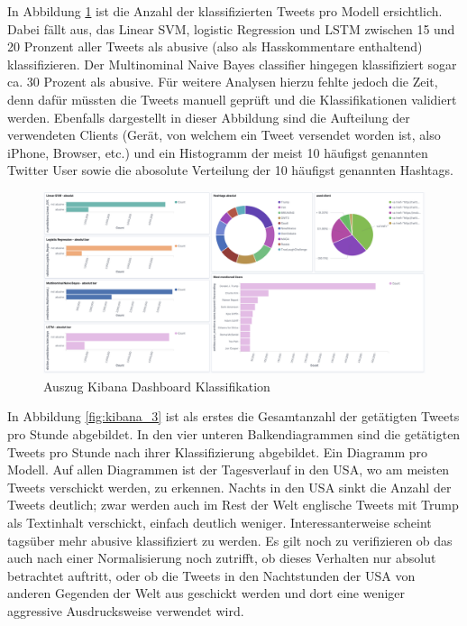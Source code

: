 In Abbildung \ref{fig:kibana_2} ist die Anzahl der klassifizierten Tweets pro Modell ersichtlich. Dabei f{\"a}llt aus, das Linear SVM, logistic Regression und LSTM zwischen 15 und 20 Pronzent aller Tweets als abusive (also als Hasskommentare enthaltend) klassifizieren. Der Multinominal Naive Bayes classifier hingegen klassifiziert sogar ca. 30 Prozent als abusive. F{\"u}r weitere Analysen hierzu fehlte jedoch die Zeit, denn daf{\"u}r m{\"u}ssten die Tweets manuell gepr{\"u}ft und die Klassifikationen validiert werden. Ebenfalls dargestellt in dieser Abbildung sind die Aufteilung der verwendeten Clients (Ger{\"a}t, von welchem ein Tweet versendet worden ist, also iPhone, Browser, etc.) und ein Histogramm der meist 10 h{\"a}ufigst genannten Twitter User sowie die abosolute Verteilung der 10 h{\"a}ufigst genannten Hashtags.

\begin{figure}[H]
	\centering
		\includegraphics[scale=0.3]{images/kibana_dash_3.png}
	\caption{Auszug Kibana Dashboard Klassifikation}
	\label{fig:kibana_2}
\end{figure}

In Abbildung \ref{fig:kibana_3} ist als erstes die Gesamtanzahl der get{\"a}tigten Tweets pro Stunde abgebildet. In den vier unteren Balkendiagrammen sind die get{\"a}tigten Tweets pro Stunde nach ihrer Klassifizierung abgebildet. Ein Diagramm pro Modell. Auf allen Diagrammen ist der Tagesverlauf in den USA, wo am meisten Tweets verschickt werden, zu erkennen. Nachts in den USA sinkt die Anzahl der Tweets deutlich; zwar werden auch im Rest der Welt englische Tweets mit Trump als Textinhalt verschickt, einfach deutlich weniger. Interessanterweise scheint tags{\"u}ber mehr abusive klassifiziert zu werden. Es gilt noch zu verifizieren ob das auch nach einer Normalisierung noch zutrifft, ob dieses Verhalten nur absolut betrachtet auftritt, oder ob die Tweets in den Nachtstunden der USA von anderen Gegenden der Welt aus geschickt werden und dort eine weniger aggressive Ausdrucksweise verwendet wird. 

